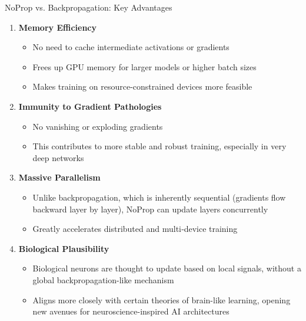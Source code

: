 \documentclass{beamer}
\begin{document}
\begin{frame}{NoProp vs. Backpropagation: Key Advantages}
  \begin{enumerate}
    \item \textbf{Memory Efficiency}  
      \begin{itemize}
        \item No need to cache intermediate activations or gradients  
        \item Frees up GPU memory for larger models or higher batch sizes 
        \item Makes training on resource-constrained devices more feasible
      \end{itemize}
    \item \textbf{Immunity to Gradient Pathologies}  
      \begin{itemize}
        \item No vanishing or exploding gradients  
        \item This contributes to more stable and robust training, especially in very deep networks 
      \end{itemize}
    \item \textbf{Massive Parallelism}  
      \begin{itemize}
        \item Unlike backpropagation, which is inherently sequential (gradients flow backward layer by layer), NoProp can update layers concurrently
        \item Greatly accelerates distributed and multi‐device training  
      \end{itemize}

          \item \textbf{Biological Plausibility}  
      \begin{itemize}
        \item Biological neurons are thought to update based on local signals, without a global backpropagation-like mechanism 
        \item Aligns more closely with certain theories of brain-like learning, opening new avenues for neuroscience-inspired AI architectures  
      \end{itemize}
  \end{enumerate}
\end{frame}
\end{document}
